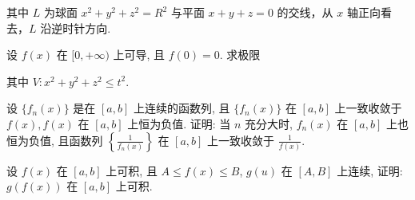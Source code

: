 其中 $L$ 为球面 $x^{2} + y^{2} + z^{2} = R^{2}$ 与平面 $x + y + z = 0$ 的交线，从 $x$ 轴正向看去，$L$ 沿逆时针方向.\par
\par{}
设 $f(x)$ 在 $[0, +\infty)$ 上可导, 且 $f(0) = 0$. 求极限\par
\nopagebreak[4]
其中 $V: x^{2} + y^{2} + z^{2} \leq t^{2}$.\par
设 $\{f_n(x)\}$ 是在 $[a, b]$ 上连续的函数列, 且 $\{f_n(x)\}$ 在 $[a, b]$ 上一致收敛于 $f(x), f(x)$ 在 $[a, b]$ 上恒为负值. 证明: 当 $n$ 充分大时, $f_n(x)$ 在 $[a, b]$ 上也恒为负值, 且函数列 $\left\{\frac{1}{f_n(x)}\right\}$ 在 $[a, b]$ 上一致收敛于 $\frac{1}{f(x)}$.\par
设 $f(x)$ 在 $[a, b]$ 上可积, 且 $A \leq f(x) \leq B$, $g(u)$ 在 $[A, B]$ 上连续, 证明: $g(f(x))$ 在 $[a, b]$ 上可积.\par
